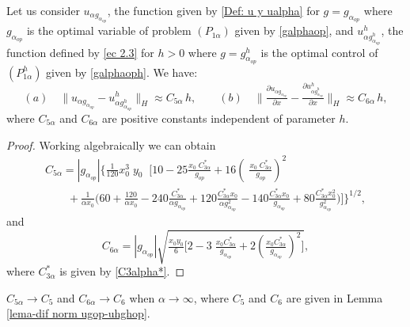 \documentclass[axioms,article,submit,moreauthors]{Definitions/mdpi}
\newcommand\pder[2][]{\ensuremath{\tfrac{\partial#1}{\partial#2}}}
\begin{document}
\begin{Lemma} Let us consider $u_{\alpha g_{\alpha_{op}}}$, the function given by \eqref{Def: u y ualpha} for $g= g_{\alpha_{op}}$ where $g_{\alpha_{op}}$ is the optimal variable of problem $(P_{1\alpha})$ given by \eqref{galphaop}, and ${u^h_{\alpha g^ h_{\alpha_{op}}}}$, the function defined by \eqref{ec 2.3} for $h>0$ where $g={g^h_{\alpha_{op}}}$ is the optimal {control} of {$(P^h_{1\alpha})$} given by
\eqref{galphaoph}. We have: 
  \[   (a) \quad
  \lVert u_{\alpha g_{\alpha_{op}}}- {u^h_{\alpha g^h_{\alpha_{op}}} }   \rVert _H \approx C_{5\alpha}\, h, \qquad
  			        (b) \quad
  \Big\lVert \pder[u_{\alpha g_{\alpha_{op}}}]{x}-\pder[ {u^h_{\alpha g^h_{\alpha_{op}}} }  ]{x}    \Big\rVert _H \approx C_{6\alpha}\, h ,
   \]
 \noindent where  $C_{5\alpha}$ and $C_{6\alpha}$ are positive constants independent of parameter $h.$
   \end{Lemma}  

   \begin{proof}
   Working algebraically we can obtain
   \[\begin{array}{ll}
   C_{5\alpha}= |g_{\alpha_{op}}| \Bigg\lbrace\tfrac{1}{120}x_0^3 \;y_0\;  \;\Big[10-25\tfrac{x_0 \; C_{3\alpha}^*}{g_{op}}+16 \left( \;\tfrac{x_0 \; C_{3\alpha}^*}{g_{op}}\right)^2\\
   \qquad +\tfrac{1}{\alpha x_0}\Big(60+\tfrac{120}{\alpha x_0}-240\tfrac{C_{3\alpha}^*}{\alpha g_{\alpha_{op}}}+120 \tfrac{C_{3\alpha}^* x_0}{\alpha g_{\alpha_{op}}^2}-140 \tfrac{C_{3\alpha}^* x_0}{ g_{\alpha_{op}}}+80 \tfrac{C_{3\alpha}^* x_0^2}{ g_{\alpha_{op}}^2} \Big)\Big]\Bigg\rbrace^{1/2},
   \end{array}\]
   and
   \[C_{6\alpha} = |g_{\alpha_{op}}|\sqrt{ \tfrac{x_0 y_0}{6}   \Big[ 2 -3\;\tfrac{x_0 C_{3\alpha}^*}{g_{\alpha_{op}}}+2 \left(\tfrac{x_0 C_{3\alpha}^*}{g_{\alpha_{op}}}\right)^2 \Big] },\]
      where $C_{3\alpha}^*$ is given by \eqref{C3alpha*}.
   \end{proof}
  \begin{Remark}  $C_{5\alpha}\to C_5$ and $C_{6\alpha}\to C_6$ when $\alpha\to\infty$, where $C_5$ and $C_6$ are given in Lemma \ref{lema-dif norm ugop-uhghop}.
  \end{Remark}
\end{document}
